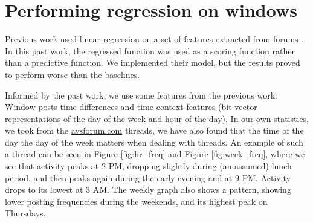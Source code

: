 \section{Performing regression on windows}
Previous work used linear regression on a set of features 
extracted from forums \cite{Yang2009}. In this past work, the regressed function 
was used as a scoring function rather than a predictive function. We implemented their model, but the results proved to perform worse than the baselines.

Informed by the past work, we use some features from the previous work: Window posts time 
differences and time context features (bit-vector representations of the day of 
the week and hour of the day). 
In our own statistics, we took from the 
\url{avsforum.com} threads, we have also found that the time of the day the day 
of the week matters when dealing with threads. An example of such a thread can 
be seen in Figure \ref{fig:hr_freq} and Figure \ref{fig:week_freq}, where we see that activity peaks at 2 PM, dropping slightly during (an assumed) lunch period, and then peaks again during the early 
evening and at 9 PM.  Activity drops to its lowest at 3 AM. The weekly graph 
also shows a pattern, showing lower posting frequencies during the weekends, and 
its highest peak on Thursdays.
